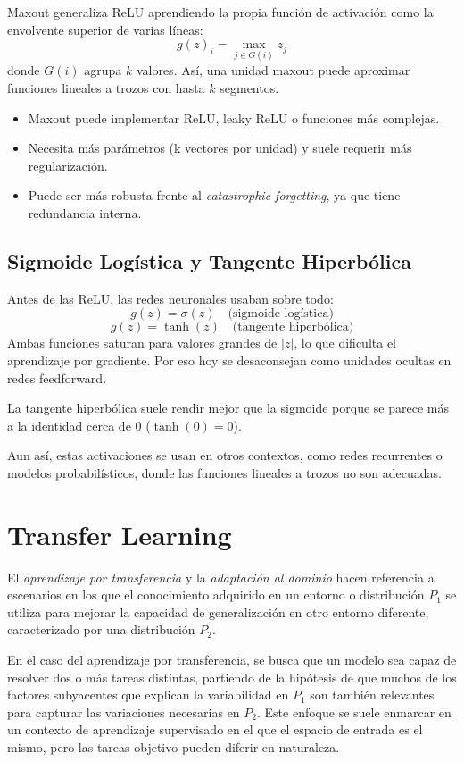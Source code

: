 Maxout generaliza ReLU aprendiendo la propia función de activación como la envolvente superior de varias líneas:
\[
g(z)_i = \max_{j \in G(i)} z_j
\]
donde $G(i)$ agrupa $k$ valores. Así, una unidad maxout puede aproximar funciones lineales a trozos con hasta $k$ segmentos.

\begin{itemize}
    \item Maxout puede implementar ReLU, leaky ReLU o funciones más complejas.
    \item Necesita más parámetros (k vectores por unidad) y suele requerir más regularización.
    \item Puede ser más robusta frente al \textit{catastrophic forgetting}, ya que tiene redundancia interna.
\end{itemize}

\subsection{Sigmoide Logística y Tangente Hiperbólica}

Antes de las ReLU, las redes neuronales usaban sobre todo:
\[
g(z) = \sigma(z) \quad \text{(sigmoide logística)}
\]
\[
g(z) = \tanh(z) \quad \text{(tangente hiperbólica)}
\]
Ambas funciones saturan para valores grandes de $|z|$, lo que dificulta el aprendizaje por gradiente. Por eso hoy se desaconsejan como unidades ocultas en redes feedforward.

La tangente hiperbólica suele rendir mejor que la sigmoide porque se parece más a la identidad cerca de 0 ($\tanh(0) = 0$).

Aun así, estas activaciones se usan en otros contextos, como redes recurrentes o modelos probabilísticos, donde las funciones lineales a trozos no son adecuadas.


\section{Transfer Learning}
El \emph{aprendizaje por transferencia} y la \emph{adaptación al dominio} hacen referencia a escenarios en los que el conocimiento adquirido en un entorno o distribución $P_1$ se utiliza para mejorar la capacidad de generalización en otro entorno diferente, caracterizado por una distribución $P_2$.

En el caso del aprendizaje por transferencia, se busca que un modelo sea capaz de resolver dos o más tareas distintas, partiendo de la hipótesis de que muchos de los factores subyacentes que explican la variabilidad en $P_1$ son también relevantes para capturar las variaciones necesarias en $P_2$. Este enfoque se suele enmarcar en un contexto de aprendizaje supervisado en el que el espacio de entrada es el mismo, pero las tareas objetivo pueden diferir en naturaleza.

